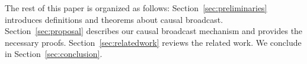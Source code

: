 The rest of this paper is organized as follows: Section~\ref{sec:preliminaries}
introduces definitions and theorems about causal
broadcast. Section~\ref{sec:proposal} describes our causal broadcast mechanism
and provides the necessary proofs. Section~\ref{sec:relatedwork} reviews the
related work. We conclude in Section~\ref{sec:conclusion}.




